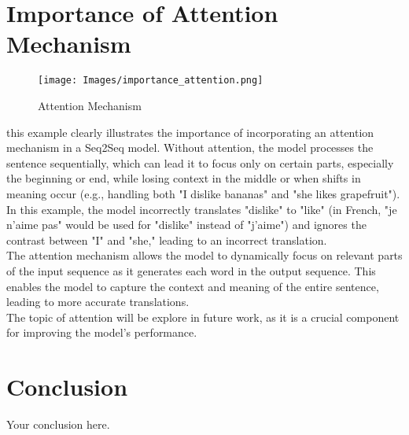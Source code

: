 \documentclass{article}
\begin{document}
\section{Importance of Attention Mechanism}
\begin{figure}[H]
    \centering
    \texttt{[image: Images/importance\_attention.png]}
    \caption{Attention Mechanism}
\end{figure}
this example clearly illustrates the importance of incorporating an attention mechanism in a Seq2Seq model. Without attention, the model processes the sentence sequentially, which can lead it to focus only on certain parts, especially the beginning or end, while losing context in the middle or when shifts in meaning occur (e.g., handling both "I dislike bananas" and "she likes grapefruit").\\ 
In this example, the model incorrectly translates "dislike" to "like" (in French, "je n'aime pas" would be used for "dislike" instead of "j'aime") and ignores the contrast between "I" and "she," leading to an incorrect translation.\\
The attention mechanism allows the model to dynamically focus on relevant parts of the input sequence as it generates each word in the output sequence. This enables the model to capture the context and meaning of the entire sentence, leading to more accurate translations.\\
The topic of attention will be explore in future work, as it is a crucial component for improving the model's performance.
\section{Conclusion}
Your conclusion here.



\end{document}
